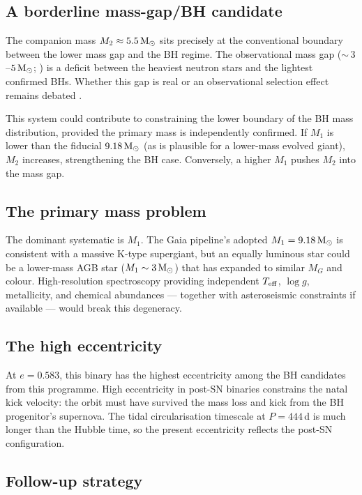 \documentclass[usenatbib,fleqn]{mnras}
\newcommand{\Msun}{{\rm M}_\odot}
\begin{document}
\subsection{A borderline mass-gap/BH candidate}

The companion mass $M_2 \approx 5.5\,\Msun$ sits precisely at the
conventional boundary between the lower mass gap and the BH
regime.  The observational mass gap ($\sim$\,$3$--$5\,\Msun$;
\citealt{Bailyn1998, Ozel2010, Farr2011}) is a deficit between the
heaviest neutron stars and the lightest confirmed BHs.  Whether
this gap is real or an observational selection effect remains
debated \citep{Jayasinghe2021, Thompson2019}.

This system could contribute to constraining the lower boundary of
the BH mass distribution, provided the primary mass is independently
confirmed.  If $M_1$ is lower than the fiducial
$9.18\,\Msun$ (as is plausible for a lower-mass evolved giant),
$M_2$ increases, strengthening the BH case.  Conversely, a higher
$M_1$ pushes $M_2$ into the mass gap.

\subsection{The primary mass problem}

The dominant systematic is $M_1$.  The Gaia pipeline's adopted
$M_1 = 9.18\,\Msun$ is consistent with a massive K-type supergiant,
but an equally luminous star could be a lower-mass AGB star
($M_1 \sim 3\,\Msun$) that has expanded to similar $M_G$ and
colour.  High-resolution spectroscopy providing independent
$T_{\rm eff}$, $\log g$, metallicity, and chemical abundances ---
together with asteroseismic constraints if available --- would break
this degeneracy.

\subsection{The high eccentricity}

At $e = 0.583$, this binary has the highest eccentricity among the
BH candidates from this programme.  High eccentricity in post-SN
binaries constrains the natal kick velocity: the orbit must have
survived the mass loss and kick from the BH progenitor's supernova.
The tidal circularisation timescale at $P = 444$\,d is much longer
than the Hubble time, so the present eccentricity reflects the
post-SN configuration.

\subsection{Follow-up strategy}
\label{sec:followup}
\end{document}

